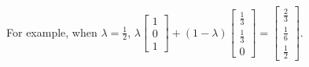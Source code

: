 \begin{enumerate}
  For example, when \(\lambda = \frac{1}{2}\),
  \(\lambda \begin{bmatrix} 1 \\ 0 \\ 1\end{bmatrix} + (1-\lambda)\begin{bmatrix} \frac{1}{3} \\ \frac{1}{3} \\ 0 \end{bmatrix} = \begin{bmatrix} \frac{2}{3} \\ \frac{1}{6} \\ \frac{1}{2}\end{bmatrix}\).
\end{enumerate}
